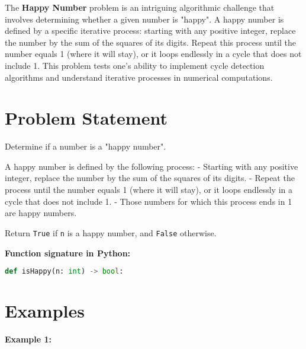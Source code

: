 
\label{chap:Happy_Number}

The \textbf{Happy Number} problem is an intriguing algorithmic challenge that involves determining whether a given number is "happy". A happy number is defined by a specific iterative process: starting with any positive integer, replace the number by the sum of the squares of its digits. Repeat this process until the number equals 1 (where it will stay), or it loops endlessly in a cycle that does not include 1. This problem tests one's ability to implement cycle detection algorithms and understand iterative processes in numerical computations.

\section*{Problem Statement}

Determine if a number is a "happy number".

A happy number is defined by the following process:
- Starting with any positive integer, replace the number by the sum of the squares of its digits.
- Repeat the process until the number equals 1 (where it will stay), or it loops endlessly in a cycle that does not include 1.
- Those numbers for which this process ends in 1 are happy numbers.

Return \texttt{True} if \texttt{n} is a happy number, and \texttt{False} otherwise.

\textbf{Function signature in Python:}
\begin{lstlisting}[language=Python]
def isHappy(n: int) -> bool:
\end{lstlisting}

\section*{Examples}

\textbf{Example 1:}

